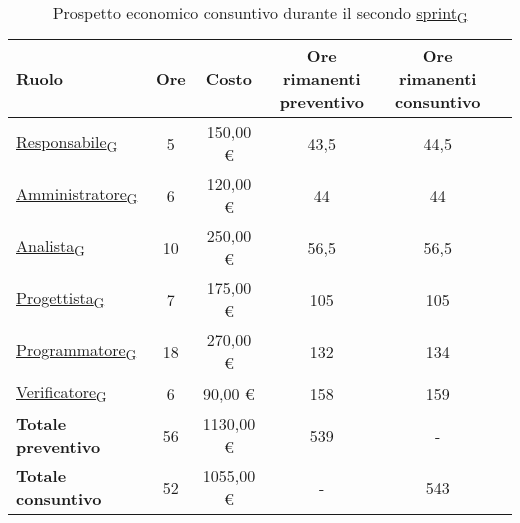 \begin{table}[!h]
	\centering
	\begin{tabular}{ | l | c | c | c | c | c | }
		\hline
		\textbf{Ruolo}             & \textbf{Ore} & \textbf{Costo} & \textbf{Ore rimanenti preventivo} & \textbf{Ore rimanenti consuntivo} \\
		\hline
		\href{https://7last.github.io/docs/rtb/documentazione-interna/glossario\#responsabile}{Responsabile\textsubscript{G}}               & 5            & 150,00 €       & 43,5                              & 44,5                              \\
		\href{https://7last.github.io/docs/rtb/documentazione-interna/glossario\#amministratore}{Amministratore\textsubscript{G}}             & 6            & 120,00 €       & 44                                & 44                                \\
		\href{https://7last.github.io/docs/rtb/documentazione-interna/glossario\#analista}{Analista\textsubscript{G}}                   & 10           & 250,00 €       & 56,5                              & 56,5                              \\
		\href{https://7last.github.io/docs/rtb/documentazione-interna/glossario\#progettista}{Progettista\textsubscript{G}}                & 7            & 175,00 €       & 105                               & 105                               \\
		\href{https://7last.github.io/docs/rtb/documentazione-interna/glossario\#programmatore}{Programmatore\textsubscript{G}}              & 18           & 270,00 €       & 132                               & 134                               \\
		\href{https://7last.github.io/docs/rtb/documentazione-interna/glossario\#verificatore}{Verificatore\textsubscript{G}}               & 6            & 90,00 €        & 158                               & 159                               \\
		\hline
		\textbf{Totale preventivo} & 56           & 1130,00 €      & 539                               & -                                 \\
		\hline
		\textbf{Totale consuntivo} & 52           & 1055,00 €      & -                                 & 543                               \\
		\hline
	\end{tabular}
	\caption{Prospetto economico consuntivo durante il secondo \href{https://7last.github.io/docs/rtb/documentazione-interna/glossario\#sprint}{sprint\textsubscript{G}}}
	
\end{table}

